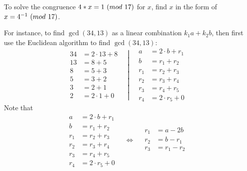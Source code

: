 \begin{remark}
    To solve the congruence $4 \ast x = 1 \ (\relax{mod}\ 17)$ for $x$, find $x$ in the form of $x = {4}^{-1} \ (\relax{mod}\ 17)$.
    
    For instance, to find $\gcd(34, 13)$ as a linear combination $k_1 a + k_2 b$, then first use the Euclidean algorithm to find $\gcd(34, 13)$:
    \begin{equation}
        \left.
        \begin{aligned}
            34 &= 2 \cdot 13 + 8 \\
            13 &= 8 + 5 \\
            8  &= 5 + 3 \\
            5  &= 3 + 2 \\
            3  &= 2 + \boxed{1} \\
            2  &= 2 \cdot 1 + 0
        \end{aligned}
        \quad
        \right\vert
        \quad
        \begin{aligned}
            a   &= 2 \cdot b + r_1 \\
            b   &= r_1 + r_2 \\
            r_1 &= r_2 + r_3 \\
            r_2 &= r_3 + r_4 \\
            r_3 &= r_4 + \boxed{r_5} \\
            r_4 &= 2 \cdot r_5 + 0
        \end{aligned}
    \end{equation}
    Note that
    \begin{equation}
            \begin{aligned}
                a   &= 2 \cdot b + r_1 \\
                b   &= r_1 + r_2 \\
                r_1 &= r_2 + r_3 \\
                r_2 &= r_3 + r_4 \\
                r_3 &= r_4 + \boxed{r_5} \\
                r_4 &= 2 \cdot r_5 + 0
            \end{aligned}
            \quad
            \Leftrightarrow
            \quad
            \begin{aligned}
                r_1         &= a - 2b \\
                r_2         &= b - r_1 \\
                r_3         &= r_1 - r_2 \\

\end{aligned}
\end{equation}
\end{remark}
